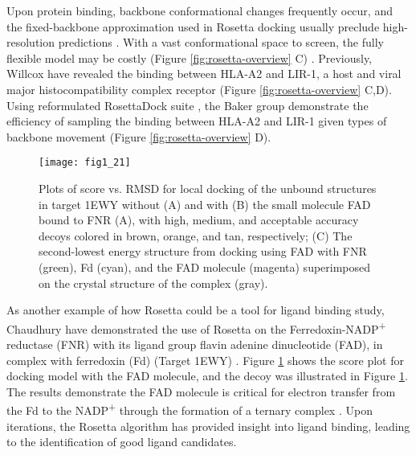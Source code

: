 \begin{refsection}
Upon protein binding, backbone conformational changes frequently occur, and the
fixed-backbone approximation used in Rosetta docking usually preclude
high-resolution predictions \cite{Das2008}. With a vast conformational space to
screen, the fully flexible model may be costly (Figure
\ref{fig:rosetta-overview} C) \cite{Wang2007a}. Previously, Willcox  have revealed the binding between HLA-A2 and LIR-1, a host and viral major
histocompatibility complex receptor \cite{Willcox2003} (Figure
\ref{fig:rosetta-overview} C,D). Using reformulated RosettaDock suite
\cite{Wang2007a}, the Baker group demonstrate the efficiency of sampling the
binding between HLA-A2 and LIR-1 given types of backbone movement
\cite{Wang2007a} (Figure \ref{fig:rosetta-overview} D). 
\begin{figure}[htbp] \centering \texttt{[image: fig1\_21]}
    \caption[Plots of score vs. RMSD for local docking of the unbound
        structures in target 1EWY without (A) and with (B) the small molecule
        FAD bound to FNR (A), with high, medium, and acceptable accuracy decoys
        colored in brown, orange, and tan, respectively; (C) The second-lowest
        energy structure from docking using FAD with FNR (green), Fd (cyan),
        and the FAD molecule (magenta) superimposed on the crystal structure of
    the complex (gray)] {Plots of score vs. RMSD for local docking of the
        unbound structures in target 1EWY without (A) and with (B) the small
        molecule FAD bound to FNR (A), with high, medium, and acceptable
        accuracy decoys colored in brown, orange, and tan, respectively; (C)
        The second-lowest energy structure from docking using FAD with FNR
        (green), Fd (cyan), and the FAD molecule (magenta) superimposed on the
        crystal structure of the complex (gray)\cite{Chaudhury2011}.} 
        \label{fig:macro-ligand} 
\end{figure}

As another example of how Rosetta could be a tool for ligand binding study, 
Chaudhury  have demonstrated the use of Rosetta on the
Ferredoxin-NADP\textsuperscript{+} reductase (FNR) with its ligand group flavin
adenine dinucleotide (FAD), in complex with ferredoxin (Fd) (Target
1EWY) \cite{Chaudhury2011}. Figure \ref{fig:macro-ligand} shows the score plot
for docking model with the FAD molecule, and the decoy was illustrated in Figure
\ref{fig:macro-ligand}. The results demonstrate the FAD molecule is critical for
electron transfer from the Fd to the NADP\textsuperscript{+} through the
formation of a ternary complex \cite{Hermoso2002}.  Upon iterations, the
Rosetta algorithm has provided insight into ligand binding, leading to the
identification of good ligand candidates.


\end{refsection}
